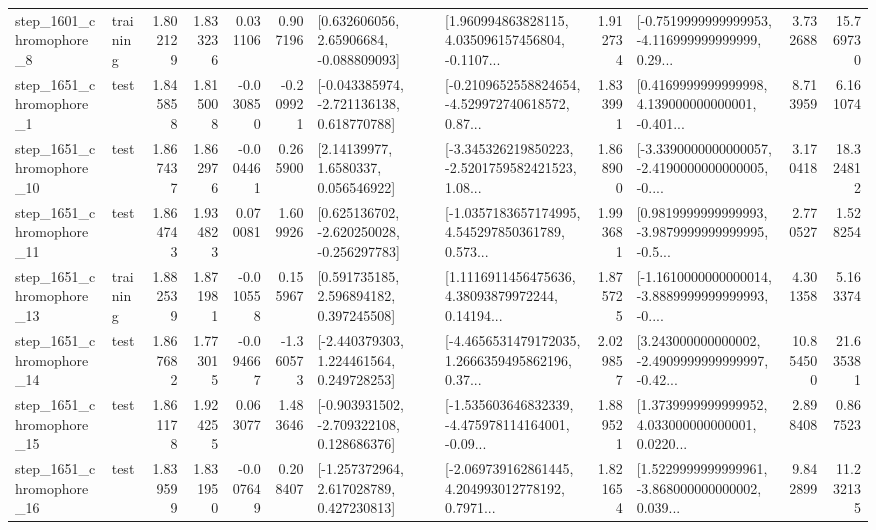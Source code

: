 \begin{tabular}{llrrrrllrlrr}
  step\_1601\_chromophore\_8 &  training &      1.802129 &    1.833236 &      0.031106 &  0.907196 &     [0.632606056, 2.65906684, -0.088809093] &  [1.960994863828115, 4.035096157456804, -0.1107... &       1.912734 &  [-0.7519999999999953, -4.116999999999999, 0.29... &            3.732688 &         15.769730 \\
  step\_1651\_chromophore\_1 &      test &      1.845858 &    1.815008 &     -0.030850 & -0.209921 &   [-0.043385974, -2.721136138, 0.618770788] &  [-0.2109652558824654, -4.529972740618572, 0.87... &       1.833991 &  [0.4169999999999998, 4.139000000000001, -0.401... &            8.713959 &          6.161074 \\
 step\_1651\_chromophore\_10 &      test &      1.867437 &    1.862976 &     -0.004461 &  0.265900 &        [2.14139977, 1.6580337, 0.056546922] &  [-3.345326219850223, -2.5201759582421523, 1.08... &       1.868900 &  [-3.3390000000000057, -2.4190000000000005, -0.... &            3.170418 &         18.324812 \\
 step\_1651\_chromophore\_11 &      test &      1.864743 &    1.934823 &      0.070081 &  1.609926 &   [0.625136702, -2.620250028, -0.256297783] &  [-1.0357183657174995, 4.545297850361789, 0.573... &       1.993681 &  [0.9819999999999993, -3.9879999999999995, -0.5... &            2.770527 &          1.528254 \\
 step\_1651\_chromophore\_13 &  training &      1.882539 &    1.871981 &     -0.010558 &  0.155967 &     [0.591735185, 2.596894182, 0.397245508] &  [1.1116911456475636, 4.38093879972244, 0.14194... &       1.875725 &  [-1.1610000000000014, -3.8889999999999993, -0.... &            4.301358 &          5.163374 \\
 step\_1651\_chromophore\_14 &      test &      1.867682 &    1.773015 &     -0.094667 & -1.360573 &    [-2.440379303, 1.224461564, 0.249728253] &  [-4.4656531479172035, 1.2666359495862196, 0.37... &       2.029857 &  [3.243000000000002, -2.4909999999999997, -0.42... &           10.854500 &         21.635381 \\
 step\_1651\_chromophore\_15 &      test &      1.861178 &    1.924255 &      0.063077 &  1.483646 &   [-0.903931502, -2.709322108, 0.128686376] &  [-1.535603646832339, -4.475978114164001, -0.09... &       1.889521 &  [1.3739999999999952, 4.033000000000001, 0.0220... &            2.898408 &          0.867523 \\
 step\_1651\_chromophore\_16 &      test &      1.839599 &    1.831950 &     -0.007649 &  0.208407 &    [-1.257372964, 2.617028789, 0.427230813] &  [-2.069739162861445, 4.204993012778192, 0.7971... &       1.821654 &  [1.5229999999999961, -3.868000000000002, 0.039... &            9.842899 &         11.232135 \\

\end{tabular}
